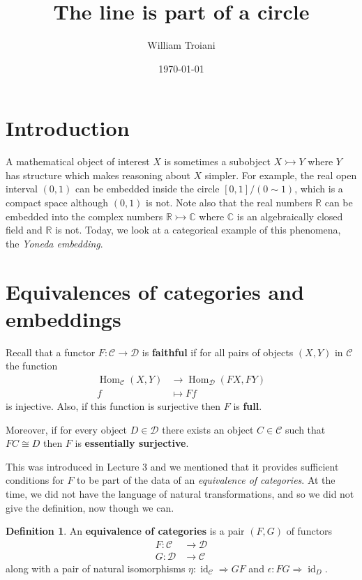 \documentclass[12pt]{article}
\title{The line is part of a circle}
\author{William Troiani}
\date{\today}
\theoremstyle{plain}
\theoremstyle{definition}
\newtheorem{defn}[thm]{Definition} %
\newcommand{\bb}[1]{\mathbb{#1}}
\newcommand{\scr}[1]{\mathscr{#1}}
\newcommand{\lto}{\longrightarrow}
\begin{document}
	\maketitle
\section{Introduction}
A mathematical object of interest $X$ is sometimes a subobject $X \rightarrowtail Y$ where $Y$ has structure which makes reasoning about $X$ simpler. For example, the real open interval $(0,1)$ can be embedded inside the circle $[0,1]/(0 \sim 1)$, which is a compact space although $(0,1)$ is not. Note also that the real numbers $\bb{R}$ can be embedded into the complex numbers $\bb{R} \rightarrowtail \bb{C}$ where $\bb{C}$ is an algebraically closed field and $\bb{R}$ is not. Today, we look at a categorical example of this phenomena, the \emph{Yoneda embedding}.

\section{Equivalences of categories and embeddings}

Recall that a functor $F: \scr{C} \lto \scr{D}$ is \textbf{faithful} if for all pairs of objects $(X,Y)$ in $\scr{C}$ the function
\begin{align*}
	\operatorname{Hom}_{\scr{C}}(X,Y) &\lto \operatorname{Hom}_{\scr{D}}(FX, FY)\\
	f &\longmapsto Ff
	\end{align*}
is injective. Also, if this function is surjective then $F$ is \textbf{full}.

Moreover, if for every object $D \in \scr{D}$ there exists an object $C \in \scr{C}$ such that $FC \cong D$ then $F$ is \textbf{essentially surjective}.

This was introduced in Lecture 3 and we mentioned that it provides sufficient conditions for $F$ to be part of the data of an \emph{equivalence of categories}. At the time, we did not have the language of natural transformations, and so we did not give the definition, now though we can.

\begin{defn}
	An \textbf{equivalence of categories} is a pair $(F,G)$ of functors
	\begin{align*}
		F: \scr{C} &\lto \scr{D}\\
		G: \scr{D} &\lto \scr{C}
		\end{align*}
	along with a pair of natural isomorphisms $\eta: \operatorname{id}_{\scr{C}} \Rightarrow GF$ and $\epsilon: FG \Rightarrow \operatorname{id}_{D}$.
	\end{defn}
\end{document}
